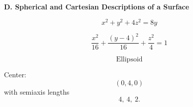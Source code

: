 \documentclass[10pt]{article}
\newcommand{\answerbar}[1]{%
  \vspace{0.55em}%
  \noindent\colorbox{sectiongray}{%
    \parbox{\dimexpr\textwidth-2\fboxsep\relax}{%
      \strut\textbf{#1}\strut
    }%
  }%
  \par\vspace{0.50em}%
}
\begin{document}
\vspace{0.25em}


\answerbar{D. Spherical and Cartesian Descriptions of a Surface}

\begin{parts}

\item
\[
\boxed{x^2+y^2+4z^2=8y}
\]

\item
\[
\boxed{
\frac{x^2}{16}
+
\frac{(y-4)^2}{16}
+
\frac{z^2}{4}
=1
}
\]

\[
\boxed{\text{Ellipsoid}}
\]

\item
Center:
\[
\boxed{(0,4,0)}
\]
with semiaxis lengths
\[
\boxed{4,\ 4,\ 2}.
\]

\end{parts}
\end{document}
